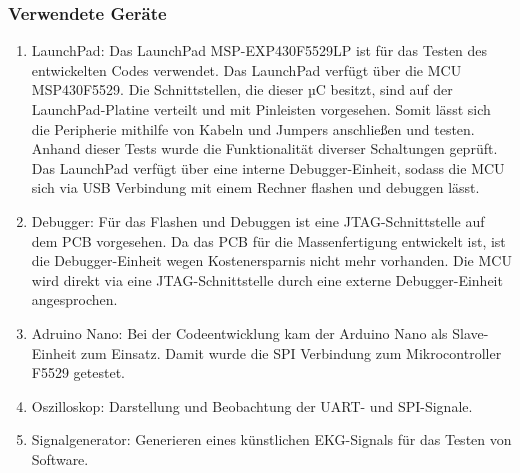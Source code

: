 \subsubsection{Verwendete Geräte}
\begin{enumerate}
	\item LaunchPad: Das LaunchPad MSP-EXP430F5529LP ist für das Testen des entwickelten Codes verwendet. Das LaunchPad verfügt über die MCU MSP430F5529. \cite{DevKit} \cite{Texas_Instruments:DevKit} Die Schnittstellen, die dieser µC besitzt, sind auf der LaunchPad-Platine verteilt und mit Pinleisten vorgesehen. Somit lässt sich die Peripherie mithilfe von Kabeln und Jumpers anschließen und testen. Anhand dieser Tests wurde die Funktionalität diverser Schaltungen geprüft. Das LaunchPad verfügt über eine interne Debugger-Einheit, sodass die MCU sich via USB Verbindung mit einem Rechner  flashen und debuggen lässt.
	\item Debugger: Für das Flashen und Debuggen ist eine JTAG-Schnittstelle auf dem PCB vorgesehen. Da das PCB für die Massenfertigung entwickelt ist, ist die Debugger-Einheit wegen Kostenersparnis nicht mehr vorhanden. Die MCU wird direkt via eine JTAG-Schnittstelle durch eine externe Debugger-Einheit angesprochen.
	\item Adruino Nano: Bei der Codeentwicklung kam der Arduino Nano als Slave-Einheit zum Einsatz. Damit wurde die SPI Verbindung zum Mikrocontroller F5529 getestet.
	\item Oszilloskop: Darstellung und Beobachtung der UART- und SPI-Signale.
	\item Signalgenerator: Generieren eines künstlichen EKG-Signals für das Testen von Software.
\end{enumerate}